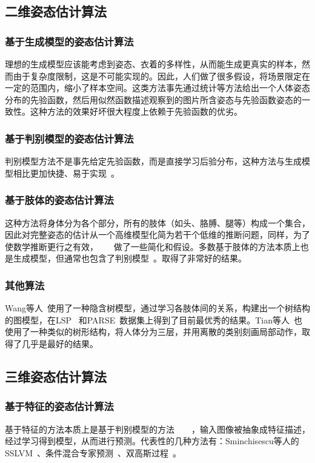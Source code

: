 \subsection{二维姿态估计算法}
\subsubsection{基于生成模型的姿态估计算法}
理想的生成模型应该能考虑到姿态、衣着的多样性，从而能生成更真实的样本，然而由于复杂度限制，这是不可能实现的。因此，人们做了很多假设，将场景限定在一定的范围内，缩小了样本空间。这类方法事先通过统计等方法给出一个人体姿态分布的先验函数，然后用似然函数描述观察到的图片所含姿态与先验函数姿态的一致性。这种方法的效果好坏很大程度上依赖于先验函数的优劣。

\subsubsection{基于判别模型的姿态估计算法}
判别模型方法不是事先给定先验函数，而是直接学习后验分布，这种方法与生成模型相比更加快捷、易于实现~\cite{gkiox2013ariarticulated}。

\subsubsection{基于肢体的姿态估计算法}
这种方法将身体分为各个部分，所有的肢体（如头、胳膊、腿等）构成一个集合，因此对完整姿态的估计从一个高维模型化简为若干个低维的推断问题，同样，为了使数学推断更行之有效，~\cite{felzenszwalb2005pictorial}~\cite{ferrari2008progressive}~\cite{ramanan2007learning} 做了一些简化和假设。多数基于肢体的方法本质上也是生成模型，但通常也包含了判别模型~\cite{andriluka2009pictorial}。\cite{yang2011articulated}取得了非常好的结果。

\subsubsection{其他算法}
Wang等人~\cite{wang2013beyond}使用了一种隐含树模型，通过学习各肢体间的关系，构建出一个树结构的图模型，在LSP~\cite{Johnson10LSP} 和PARSE~\cite{ramanan2007learning}数据集上得到了目前最优秀的结果。Tian等人~\cite{tian2012exploring}也使用了一种类似的树形结构，将人体分为三层，并用离散的类别刻画局部动作，取得了几乎是最好的结果。

\subsection{三维姿态估计算法}
\subsubsection{基于特征的姿态估计算法}
基于特征的方法本质上是基于判别模型的方法~\cite{agarwal2006local}~\cite{rosales2002learning}~\cite{shakhnarovich2003fast}~\cite{sminchisescu2005discriminative}，输入图像被抽象成特征描述，经过学习得到模型，从而进行预测。代表性的几种方法有：Sminchisescu等人的SSLVM~\cite{bo2009SSLVM}、条件混合专家预测~\cite{bo2008fast}、双高斯过程~\cite{bo2010twin}。


